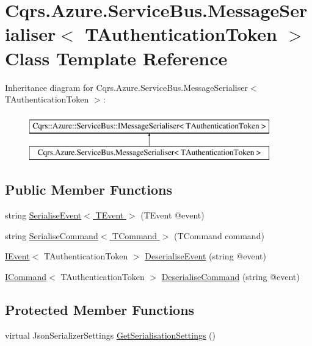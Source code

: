 \hypertarget{classCqrs_1_1Azure_1_1ServiceBus_1_1MessageSerialiser}{}\section{Cqrs.\+Azure.\+Service\+Bus.\+Message\+Serialiser$<$ T\+Authentication\+Token $>$ Class Template Reference}
\label{classCqrs_1_1Azure_1_1ServiceBus_1_1MessageSerialiser}
Inheritance diagram for Cqrs.\+Azure.\+Service\+Bus.\+Message\+Serialiser$<$ T\+Authentication\+Token $>$\+:\begin{figure}[H]
\begin{center}
\leavevmode
\includegraphics[height=2.000000cm]{classCqrs_1_1Azure_1_1ServiceBus_1_1MessageSerialiser}
\end{center}
\end{figure}
\subsection*{Public Member Functions}
\begin{DoxyCompactItemize}
\item 
string \hyperlink{classCqrs_1_1Azure_1_1ServiceBus_1_1MessageSerialiser_a596224ec927c673958e72a2153931c09}{Serialise\+Event$<$ T\+Event $>$} (T\+Event @event)
\item 
string \hyperlink{classCqrs_1_1Azure_1_1ServiceBus_1_1MessageSerialiser_a50107f67d604c45136d9fa3d73400e3a}{Serialise\+Command$<$ T\+Command $>$} (T\+Command command)
\item 
\hyperlink{interfaceCqrs_1_1Events_1_1IEvent}{I\+Event}$<$ T\+Authentication\+Token $>$ \hyperlink{classCqrs_1_1Azure_1_1ServiceBus_1_1MessageSerialiser_a7b96e89475e9218fcb7a690fe4d02279}{Deserialise\+Event} (string @event)
\item 
\hyperlink{interfaceCqrs_1_1Commands_1_1ICommand}{I\+Command}$<$ T\+Authentication\+Token $>$ \hyperlink{classCqrs_1_1Azure_1_1ServiceBus_1_1MessageSerialiser_a7cbab381f4758f8dd04cd17e2c5f2c3a}{Deserialise\+Command} (string @event)
\end{DoxyCompactItemize}
\subsection*{Protected Member Functions}
\begin{DoxyCompactItemize}
\item 
virtual Json\+Serializer\+Settings \hyperlink{classCqrs_1_1Azure_1_1ServiceBus_1_1MessageSerialiser_aca8f19355749092a6ad7b5085dc7f057}{Get\+Serialisation\+Settings} ()
\end{DoxyCompactItemize}
